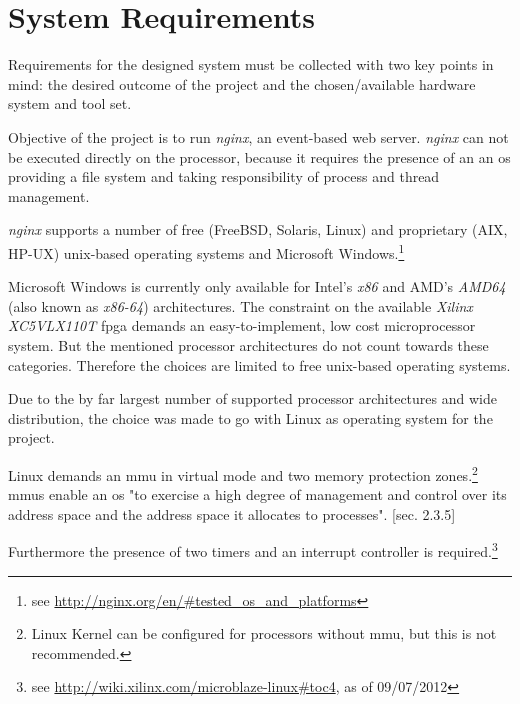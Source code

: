 \chapter{System Requirements}

Requirements for the designed system must be collected with two key points in mind: the desired outcome of the project and the chosen/available hardware system and tool set.

Objective of the project is to run \textit{nginx}, an event-based web server. \textit{nginx} can not be executed directly on the processor, because it requires the presence of an an \gls{os} providing a file system and taking responsibility of process and thread management. 

\textit{nginx} supports a number of free (FreeBSD, Solaris, Linux) and proprietary (AIX, HP-UX) unix-based operating systems and Microsoft Windows.\footnote{see \url{http://nginx.org/en/\#tested_os_and_platforms}}

Microsoft Windows is currently only available for Intel's \textit{x86} and AMD's \textit{AMD64} (also known as \textit{x86-64}) architectures. The constraint on the available \textit{Xilinx XC5VLX110T} \gls{fpga} demands an easy-to-implement, low cost microprocessor system. But the mentioned processor architectures do not count towards these categories. Therefore the choices are limited to free unix-based operating systems.

Due to the by far largest number of supported processor architectures and wide distribution, the choice was made to go with Linux as operating system for the project.

Linux demands an \gls{mmu} in virtual mode and two memory protection zones.\footnote{Linux Kernel can be configured for processors without \gls{mmu}, but this is not recommended.} \gls{mmu}s enable an \gls{os} "to exercise a high degree of
management and control over its address space and the address space it allocates to processes". \cite{linuxPrimer}[sec. 2.3.5]

Furthermore the presence of two timers and an interrupt controller is required.\footnote{see \url{http://wiki.xilinx.com/microblaze-linux\#toc4}, as of 09/07/2012}